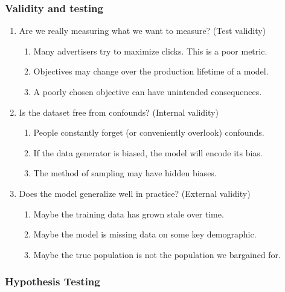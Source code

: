 \documentclass{beamer}
\begin{document}
\begin{frame}
\frametitle{Validity and testing}
\begin{enumerate}
\item Are we really measuring what we want to measure? (Test validity)
\begin{enumerate}
\item Many advertisers try to maximize clicks. This is a poor metric.
\item Objectives may change over the production lifetime of a model.
\item A poorly chosen objective can have unintended consequences.
\end{enumerate}
\item Is the dataset free from confounds? (Internal validity)
\begin{enumerate}
\item People constantly forget (or conveniently overlook) confounds.
\item If the data generator is biased, the model will encode its bias.
\item The method of sampling may have hidden biases.
\end{enumerate}
\item Does the model generalize well in practice? (External validity)
\begin{enumerate}
\item Maybe the training data has grown stale over time.
\item Maybe the model is missing data on some key demographic.
\item Maybe the true population is not the population we bargained for.
\end{enumerate}
\end{enumerate}
\end{frame}

\begin{frame}
\frametitle{Hypothesis Testing}
\vspace{-1cm}
\center{}
\end{frame}
\end{document}
